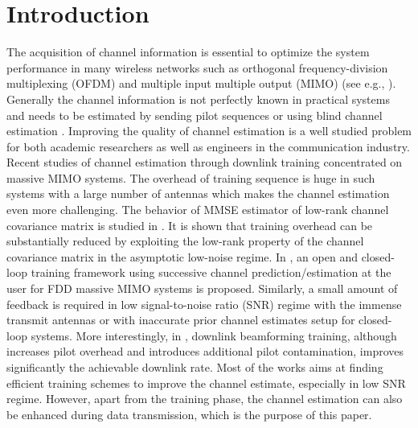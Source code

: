 \documentclass[francais]{gretsi}
\begin{document}
\maketitle


\section{Introduction}
\label{sec:intro}

The acquisition of channel information is essential to optimize the system performance in many wireless networks such as orthogonal frequency-division multiplexing (OFDM) and multiple input multiple output (MIMO) (see e.g., \cite{Li-2002,Fang-TWC-2017,Choi-TSP-2014,Inter-TWC-2019}). Generally the channel information is not perfectly known in practical systems and needs to be estimated by sending pilot sequences \cite{caire-tit-2010} or using blind channel estimation \cite{blind-2002}. Improving the quality of channel estimation is a well studied problem for both academic researchers as well as engineers in the communication industry.  {Recent studies of channel estimation through downlink training concentrated on massive MIMO systems.  The overhead of training sequence is huge in such systems with a large number of antennas which makes the channel estimation even more challenging.   The behavior of MMSE estimator
of  low-rank channel covariance matrix is studied in \cite{Fang-TWC-2017}.  It is shown that training overhead can be substantially reduced by exploiting the low-rank property of the channel covariance matrix in the asymptotic low-noise regime. In \cite{Choi-TSP-2014}, an open and closed-loop training
framework using successive channel prediction/estimation at the user for FDD massive MIMO systems is proposed. Similarly, a small amount of
feedback is required in low signal-to-noise ratio (SNR) regime with the immense transmit antennas or with inaccurate prior channel estimates setup for closed-loop systems. More interestingly, in \cite{Inter-TWC-2019}, downlink
beamforming training, although increases pilot overhead and
introduces additional pilot contamination, improves significantly
the achievable downlink rate.} Most of the works aims at finding efficient training schemes to improve the channel estimate, especially in low SNR regime. However, apart from the training phase, the channel estimation can also be enhanced during data transmission, which is the purpose of this paper. 
\end{document}
